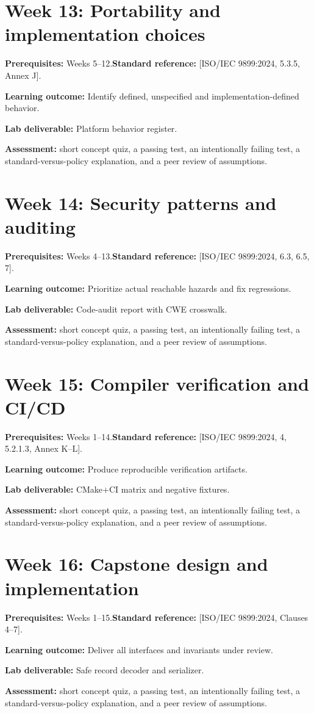 \documentclass[10pt,letterpaper,oneside]{report}
\newcommand{\refcl}[1]{\textsf{\footnotesize[ISO/IEC 9899:2024, #1]}}
\begin{document}
\section{Week 13: Portability and implementation choices}
\textbf{Prerequisites:} Weeks 5--12.\quad \textbf{Standard reference:} \refcl{5.3.5, Annex J}.\par\textbf{Learning outcome:} Identify defined, unspecified and implementation-defined behavior.\par\textbf{Lab deliverable:} Platform behavior register.\par\textbf{Assessment:} short concept quiz, a passing test, an intentionally failing test, a standard-versus-policy explanation, and a peer review of assumptions.

\section{Week 14: Security patterns and auditing}
\textbf{Prerequisites:} Weeks 4--13.\quad \textbf{Standard reference:} \refcl{6.3, 6.5, 7}.\par\textbf{Learning outcome:} Prioritize actual reachable hazards and fix regressions.\par\textbf{Lab deliverable:} Code-audit report with CWE crosswalk.\par\textbf{Assessment:} short concept quiz, a passing test, an intentionally failing test, a standard-versus-policy explanation, and a peer review of assumptions.

\section{Week 15: Compiler verification and CI/CD}
\textbf{Prerequisites:} Weeks 1--14.\quad \textbf{Standard reference:} \refcl{4, 5.2.1.3, Annex K--L}.\par\textbf{Learning outcome:} Produce reproducible verification artifacts.\par\textbf{Lab deliverable:} CMake+CI matrix and negative fixtures.\par\textbf{Assessment:} short concept quiz, a passing test, an intentionally failing test, a standard-versus-policy explanation, and a peer review of assumptions.

\section{Week 16: Capstone design and implementation}
\textbf{Prerequisites:} Weeks 1--15.\quad \textbf{Standard reference:} \refcl{Clauses 4--7}.\par\textbf{Learning outcome:} Deliver all interfaces and invariants under review.\par\textbf{Lab deliverable:} Safe record decoder and serializer.\par\textbf{Assessment:} short concept quiz, a passing test, an intentionally failing test, a standard-versus-policy explanation, and a peer review of assumptions.
\end{document}
